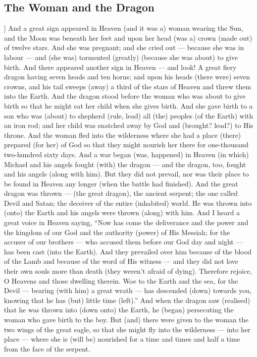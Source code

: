 \begin{pages}
\begin{Leftside}
        			\chapter{The Woman and the Dragon}
				]		
		And a great sign appeared in Heaven (and it was a) woman wearing the Sun, and the Moon was beneath her feet and upon her head (was a) crown (made out) of twelve stars. And she was pregnant; and she cried out — because she was in labour — and (she was) tormented (greatly) (because she was about) to give birth. 
		\pend
		\pstart
		And there appeared another sign in Heaven — and look! A great fiery dragon having seven heads and ten horns; and upon his heads (there were) seven crowns, and his tail sweeps (away) a third of the stars of Heaven and threw them into the Earth. And the dragon stood before the woman who was about to give birth so that he might eat her child when she gives birth. And she gave birth to a son who was (about) to shepherd (rule, lead) all (the) peoples (of the Earth) with an iron rod; and her child was snatched away by God and (brought? lead?) to His throne. 
		\pend
		\pstart
		And the woman fled into the wilderness where she had a place (there) prepared (for her) of God so that they might nourish her there for one-thousand two-hundred sixty days. And a war began (was, happened) in Heaven (in which) Michael and his angels fought (with) the dragon — and the dragon, too, fought and his angels (along with him). But they did not prevail, nor was their place to be found in Heaven any longer (when the battle had finished). 
		\pend
		\pstart
		And the great dragon was thrown — (the great dragon), the ancient serpent; the one called Devil and Satan; the deceiver of the entire (inhabited) world. He was thrown into (onto) the Earth and his angels were thrown (along) with him. And I heard a great voice in Heaven saying, “Now has come the deliverance and the power and the kingdom of our God and the authority (power) of His Messiah; for the accuser of our brothers — who accused them before our God day and night — has been cast (into the Earth). 
		\pend
		\pstart
		And they prevailed over him because of the blood of the Lamb and because of the word of His witness — and they did not love their own souls more than death (they weren’t afraid of dying). Therefore rejoice, O Heavens and those dwelling therein. Woe to the Earth and the sea, for the Devil — bearing (with him) a great wrath — has descended (down) towards you, knowing that he has (but) little time (left).”
		\pend
		\pstart
		And when the dragon saw (realised) that he was thrown into (down onto) the Earth, he (began) persecuting the woman who gave birth to the boy. But (and) there were given to the woman the two wings of the great eagle, so that she might fly into the wilderness — into her place — where she is (will be) nourished for a time and times and half a time from the face of the serpent. 

\end{Leftside}
\end{pages}
